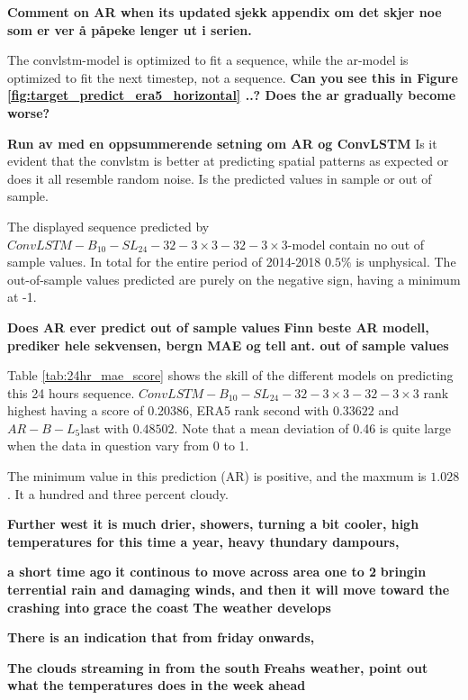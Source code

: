 \textbf{Comment on AR when its updated}
\textbf{sjekk appendix om det skjer noe som er ver å påpeke lenger ut i serien.}

The \acrshort{convlstm}-model is optimized to fit a sequence, while the \acrshort{ar}-model is optimized to fit the next timestep, not a sequence.
\textbf{Can you see this in Figure \ref{fig:target_predict_era5_horizontal} ..? Does the ar gradually become worse?}

\textbf{Run av med en oppsummerende setning om AR og ConvLSTM}
Is it evident that the \acrshort{convlstm} is better at predicting spatial patterns as expected or does it all resemble random noise. Is the predicted values in sample or out of sample.

The displayed sequence predicted by $ConvLSTM-B_{10}-SL_{24}-32-3\times3-32-3 \times3$-model contain no out of sample values. In total for the entire period of 2014-2018 $0.5\%$ is unphysical. The out-of-sample values predicted are purely on the negative sign, having a minimum at -1. 

\textbf{Does AR ever predict out of sample values}
\textbf{Finn beste AR modell, prediker hele sekvensen, bergn MAE og tell ant. out of sample values}

Table \ref{tab:24hr_mae_score} shows the skill of the different models on predicting this 24 hours sequence. $ConvLSTM-B_{10}-SL_{24}-32-3\times3-32-3\times3$ rank highest having a score of 0.20386, ERA5 rank second with  $0.33622$ and $AR-B-L_5$last with  $0.48502$. Note that a mean deviation of 0.46 is quite large when the data in question vary from 0 to 1. 


The minimum value in this prediction (AR) is positive, and the maxmum is $1.028$. It a hundred and three percent cloudy. 

\textbf{Further west it is much drier, showers, turning a bit cooler, high temperatures for this time a year, heavy thundary dampours, }

\textbf{a short time ago}
\textbf{it continous to move across area one to 2}
\textbf{bringin terrential rain and damaging winds, and then it will move toward the }
\textbf{crashing into }
\textbf{grace the coast}
\textbf{The weather develops}

\textbf{There is an indication that from friday onwards, }

\textbf{The clouds streaming in from the south}
\textbf{Freahs weather, point out what the temperatures does in the week ahead}

